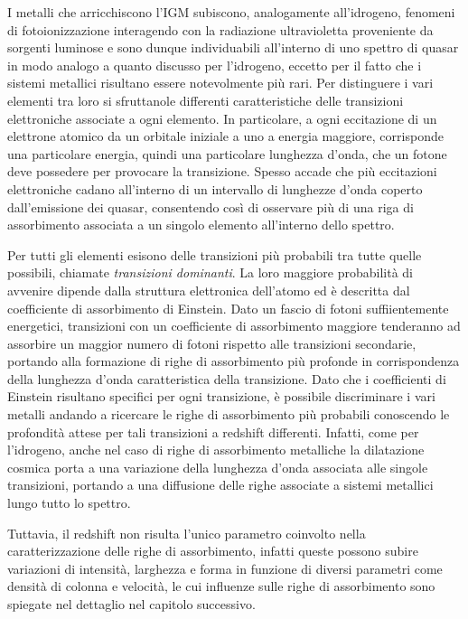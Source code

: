 \documentclass[a4paper,12pt]{article}
\begin{document}
I metalli che arricchiscono l'IGM subiscono, analogamente all'idrogeno, fenomeni di fotoionizzazione interagendo con la radiazione ultravioletta proveniente da sorgenti luminose e sono dunque individuabili all'interno di uno spettro di quasar in modo analogo a quanto discusso per l'idrogeno, eccetto per il fatto che i sistemi metallici risultano essere notevolmente più rari. Per distinguere i vari elementi tra loro si sfruttanole differenti caratteristiche delle transizioni elettroniche associate a ogni elemento. In particolare, a ogni eccitazione di un elettrone atomico da un orbitale iniziale a uno a energia maggiore, corrisponde una particolare energia, quindi una particolare lunghezza d'onda, che un fotone deve possedere per provocare la transizione. Spesso accade che più eccitazioni elettroniche cadano all'interno di un intervallo di lunghezze d'onda coperto dall'emissione dei quasar, consentendo così di osservare più di una riga di assorbimento associata a un singolo elemento all'interno dello spettro.  

Per tutti gli elementi esisono delle transizioni più probabili tra tutte quelle possibili, chiamate \textit{transizioni dominanti}. La loro maggiore probabilità di avvenire dipende dalla struttura elettronica dell'atomo ed è descritta dal coefficiente di assorbimento di Einstein. Dato un fascio di fotoni suffiientemente energetici, transizioni con un coefficiente di assorbimento maggiore tenderanno ad assorbire un maggior numero di fotoni rispetto alle transizioni secondarie, portando alla formazione di righe di assorbimento più profonde in corrispondenza della lunghezza d'onda caratteristica della transizione. Dato che i coefficienti di Einstein risultano specifici per ogni transizione, è possibile discriminare i vari metalli andando a ricercare le righe di assorbimento più probabili conoscendo le profondità attese per tali transizioni a redshift differenti. Infatti, come per l'idrogeno, anche nel caso di righe di assorbimento metalliche la dilatazione cosmica porta a una variazione della lunghezza d'onda associata alle singole transizioni, portando a una diffusione delle righe associate a sistemi metallici lungo tutto lo spettro. 

Tuttavia, il redshift non risulta l'unico parametro coinvolto nella caratterizzazione delle righe di assorbimento, infatti queste possono subire variazioni di intensità, larghezza e forma in funzione di diversi parametri come densità di colonna e velocità, le cui influenze sulle righe di assorbimento sono spiegate nel dettaglio nel capitolo successivo.%
\end{document}
